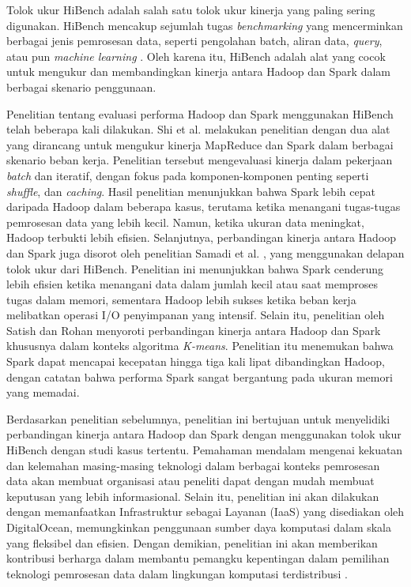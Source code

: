 Tolok ukur HiBench adalah salah satu tolok ukur kinerja yang paling sering digunakan. HiBench mencakup sejumlah tugas \textit{benchmarking} yang mencerminkan berbagai jenis pemrosesan data, seperti pengolahan batch, aliran data, \textit{query}, atau pun \textit{machine learning} \cite{huangHiBenchBenchmarkSuitea}. Oleh karena itu, HiBench adalah alat yang cocok untuk mengukur dan membandingkan kinerja antara Hadoop dan Spark dalam berbagai skenario penggunaan.

Penelitian tentang evaluasi performa Hadoop dan Spark menggunakan HiBench telah beberapa kali dilakukan. Shi et al. \cite{shiClashTitansMapReduce2015} melakukan penelitian dengan dua alat yang dirancang untuk mengukur kinerja MapReduce dan Spark dalam berbagai skenario beban kerja. Penelitian tersebut mengevaluasi kinerja dalam pekerjaan \textit{batch} dan iteratif, dengan fokus pada komponen-komponen penting seperti \textit{shuffle}, dan \textit{caching}. Hasil penelitian menunjukkan bahwa Spark lebih cepat daripada Hadoop dalam beberapa kasus, terutama ketika menangani tugas-tugas pemrosesan data yang lebih kecil. Namun, ketika ukuran data meningkat, Hadoop terbukti lebih efisien. Selanjutnya, perbandingan kinerja antara Hadoop dan Spark juga disorot oleh penelitian Samadi et al. \cite{samadiComparativeStudyHadoop2016}, yang menggunakan delapan tolok ukur dari HiBench. Penelitian ini menunjukkan bahwa Spark cenderung lebih efisien ketika menangani data dalam jumlah kecil atau saat memproses tugas dalam memori, sementara Hadoop lebih sukses ketika beban kerja melibatkan operasi I/O penyimpanan yang intensif. Selain itu, penelitian oleh Satish dan Rohan \cite{gopalaniComparingApacheSpark2015} menyoroti perbandingan kinerja antara Hadoop dan Spark khususnya dalam konteks algoritma \textit{K-means}. Penelitian itu menemukan bahwa Spark dapat mencapai kecepatan hingga tiga kali lipat dibandingkan Hadoop, dengan catatan bahwa performa Spark sangat bergantung pada ukuran memori yang memadai.

Berdasarkan penelitian sebelumnya, penelitian ini bertujuan untuk menyelidiki perbandingan kinerja antara Hadoop dan Spark dengan menggunakan tolok ukur HiBench dengan studi kasus tertentu. Pemahaman mendalam mengenai kekuatan dan kelemahan masing-masing teknologi dalam berbagai konteks pemrosesan data akan membuat organisasi atau peneliti dapat dengan mudah membuat keputusan yang lebih informasional. Selain itu, penelitian ini akan dilakukan dengan memanfaatkan Infrastruktur sebagai Layanan (IaaS) yang disediakan oleh DigitalOcean, memungkinkan penggunaan sumber daya komputasi dalam skala yang fleksibel dan efisien. Dengan demikian, penelitian ini akan memberikan kontribusi berharga dalam membantu pemangku kepentingan dalam pemilihan teknologi pemrosesan data dalam lingkungan komputasi terdistribusi .

